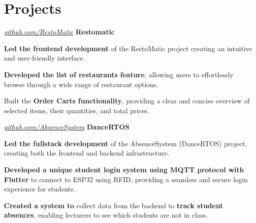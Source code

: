 \documentclass[../main.tex]{subfiles}
\begin{document}
\section{Projects}

\begin{twocolentry}{
    \small
    \textit{\href{https://github.com/SistemBasisData2023/RestoMatic}{github.com/RestoMatic}}
}
    \textbf{Restomatic}
\end{twocolentry}

\vspace{0.10 cm}
\begin{onecolentry}
\begin{highlights}
    \item \textbf{Led the frontend development} of the RestoMatic project creating an intuitive and user-friendly interface.
    \item \textbf{Developed the list of restaurants feature}, allowing users to effortlessly browse through a wide range of restaurant options.
    \item Built the \textbf{Order Carts functionality}, providing a clear and concise overview of selected items, their quantities, and total prices.
\end{highlights}
\end{onecolentry}

\vspace{0.2 cm}

\begin{twocolentry}{
    \small
    \textit{\href{https://github.com/cattyman919/AbsenceSystem/tree/main}{github.com/AbsenceSystem}}
}
    \textbf{DanceRTOS}
\end{twocolentry}

\vspace{0.10 cm}
\begin{onecolentry}
\begin{highlights}
    \item \textbf{Led the fullstack development} of the AbsenceSystem (DanceRTOS) project, creating both the frontend and backend infrastructure.
    \item \textbf{Developed a unique student login system using MQTT protocol with Flutter} to connect to ESP32 using RFID, providing a seamless and secure login experience for students.
    \item \textbf{Created a system to} collect data from the backend to \textbf{track student absences}, enabling lecturers to see which students are not in class.
\end{highlights}
\end{onecolentry}
\end{document}
